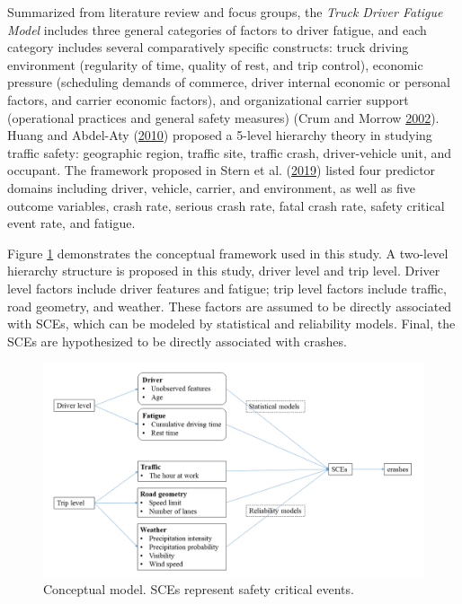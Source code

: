 \documentclass[12pt]{book}
\numberwithin{equation}{chapter}
\begin{document}
Summarized from literature review and focus groups, the \emph{Truck Driver Fatigue Model} includes three general categories of factors to driver fatigue, and each category includes several comparatively specific constructs: truck driving environment (regularity of time, quality of rest, and trip control), economic pressure (scheduling demands of commerce, driver internal economic or personal factors, and carrier economic factors), and organizational carrier support (operational practices and general safety measures) (Crum and Morrow \protect\hyperlink{ref-crum2002influence}{2002}). Huang and Abdel-Aty (\protect\hyperlink{ref-huang2010multilevel}{2010}) proposed a 5-level hierarchy theory in studying traffic safety: geographic region, traffic site, traffic crash, driver-vehicle unit, and occupant. The framework proposed in Stern et al. (\protect\hyperlink{ref-stern2019data}{2019}) listed four predictor domains including driver, vehicle, carrier, and environment, as well as five outcome variables, crash rate, serious crash rate, fatal crash rate, safety critical event rate, and fatigue.

Figure \ref{fig:conceptmodel} demonstrates the conceptual framework used in this study. A two-level hierarchy structure is proposed in this study, driver level and trip level. Driver level factors include driver features and fatigue; trip level factors include traffic, road geometry, and weather. These factors are assumed to be directly associated with SCEs, which can be modeled by statistical and reliability models. Final, the SCEs are hypothesized to be directly associated with crashes.

\begin{figure}[H]

{\centering \includegraphics[width=\linewidth]{figs/conceptual_model} 

}

\caption{Conceptual model. SCEs represent safety critical events.}\label{fig:conceptmodel}
\end{figure}
\end{document}
